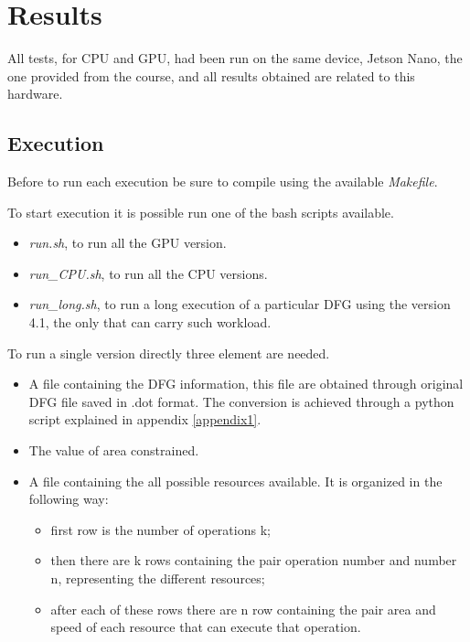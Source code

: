 \chapter{Results}
\label{chap4}

All tests, for CPU and GPU, had been run on the same device, Jetson Nano, the one provided from the course, and all 
results obtained are related to this hardware.

\section{Execution}

Before to run each execution be sure to compile using the available \emph{Makefile}.

To start execution it is possible run one of the bash scripts available.

\begin{itemize}
    \item \emph{run.sh}, to run all the GPU version.
    \item \emph{run\_CPU.sh}, to run all the CPU versions.
    \item \emph{run\_long.sh}, to run a long execution of a particular DFG using the version 4.1,
    the only that can carry such workload.
\end{itemize}

To run a single version directly three element are needed.

\begin{itemize}
    \item A file containing the DFG information, this file are obtained through original DFG file saved in .dot format.
    The conversion is achieved through a python script explained in appendix \ref{appendix1}.
    \item The value of area constrained.
    \item A file containing the all possible resources available. It is organized in the following way:
    \begin{itemize}
        \item first row is the number of operations k;
        \item then there are k rows containing the pair operation number and number n, representing the different resources;
        \item after each of these rows there are n row containing the pair area and speed of each resource that can execute that operation.
    \end{itemize}
\end{itemize}

